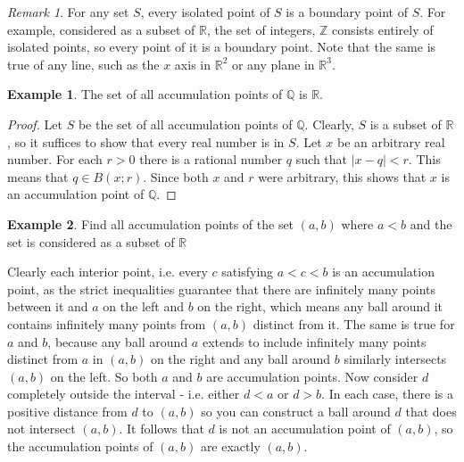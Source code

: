 \documentclass[11pt,a4paper]{report}
\theoremstyle{plain}
\theoremstyle{definition}
\newtheorem{exmp}{Example}[section]
\theoremstyle{remark}
\newtheorem*{rem}{Remark}
\begin{document}
\begin{rem}
For any set $S$, every isolated point of $S$ is a boundary point of $S$.  For example, considered as a subset of $\mathbb{R}$, the set of integers, $\mathbb{Z}$ consists entirely of isolated points, so every point of it is a boundary point.  Note that the same is true of any line, such as the $x$ axis in $\mathbb{R}^2$ or any plane in $\mathbb{R}^3$.
\end{rem}

\begin{exmp}
The set of all accumulation points of $\mathbb{Q}$ is $\mathbb{R}$.
\begin{proof}
Let $S$ be the set of all accumulation points of $\mathbb{Q}$.  Clearly, $S$ is a subset of $\mathbb{R}$, so it suffices to show that every real number is in $S$.  Let $x$ be an arbitrary real number.  For each $r>0$ there is a rational number $q$ such that $|x-q|<r$.  This means that $q \in B(x;r)$.  Since both $x$ and $r$ were arbitrary, this shows that $x$ is an accumulation point of $\mathbb{Q}$. 
\end{proof}
\end{exmp}

\begin{exmp}
Find all accumulation points of the set $(a,b)$ where $a<b$ and the set is considered as a subset of $\mathbb{R}$

Clearly each interior point, i.e. every $c$ satisfying $a<c<b$ is an accumulation point, as the strict inequalities guarantee that there are infinitely many points between it and $a$ on the left and $b$ on the right, which means any ball around it contains infinitely many points from $(a,b)$ distinct from it.  The same is true for $a$ and $b$, because any ball around $a$ extends to include infinitely many points distinct from $a$ in $(a,b)$ on the right and any ball around $b$ similarly intersects $(a,b)$ on the left.  So both $a$ and $b$ are accumulation points.  Now consider $d$ completely outside the interval - i.e. either $d<a$ or $d>b$.  In each case, there is a positive distance from $d$ to $(a,b)$ so you can construct a ball around $d$ that does not intersect $(a,b)$.  It follows that $d$ is not an accumulation point of $(a,b)$, so the accumulation points of $(a,b)$ are exactly $(a,b)$.
\end{exmp}
\end{document}
